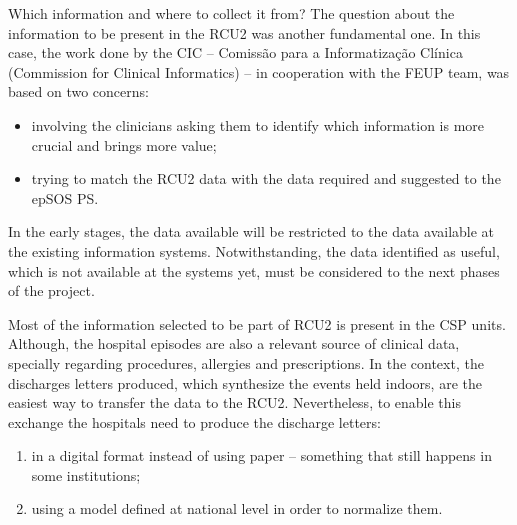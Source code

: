 Which information and where to collect it from? The question about the information to be present in the RCU2 was another fundamental one. In this case, the work done by the CIC -- Comissão para a Informatização Clínica (Commission for Clinical Informatics) -- in cooperation with the FEUP team, was based on two concerns:
\begin{itemize}
\item involving the clinicians asking them to identify which information is more crucial and brings more value;
\item trying to match the RCU2 data with the data required and suggested to the epSOS PS.
\end{itemize}
In the early stages, the data available will be restricted to the data available at the existing information systems. Notwithstanding, the data identified as useful, which is not available at the systems yet, must be considered to the next phases of the project.

Most of the information selected to be part of RCU2 is present in the CSP units. Although, the hospital episodes are also a relevant source of clinical data, specially regarding procedures, allergies and prescriptions. In the context, the discharges letters produced, which synthesize the events held indoors, are the easiest way to transfer the data to the RCU2. Nevertheless, to enable this exchange the hospitals need to produce the discharge letters:
\begin{enumerate}
\item in a digital format instead of using paper -- something that still happens in some institutions;
\item using a model defined at national level in order to normalize them.
\end{enumerate}






